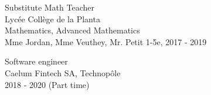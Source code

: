   \commonvspace
  \color{deepgray}
  \large Substitute Math Teacher \\
  \color{mediumgray} \small
  Lycée Collège de la Planta \\
  Mathematics, Advanced Mathematics \\
  Mme Jordan, Mme Veuthey, Mr. Petit
  1-5e, 2017 - 2019

  \color{deepgray}
  \large Software engineer \\
  \color{mediumgray} \small
  Caelum Fintech SA, Technopôle \\
  2018 - 2020 (Part time)
  \commonvspace
\fi